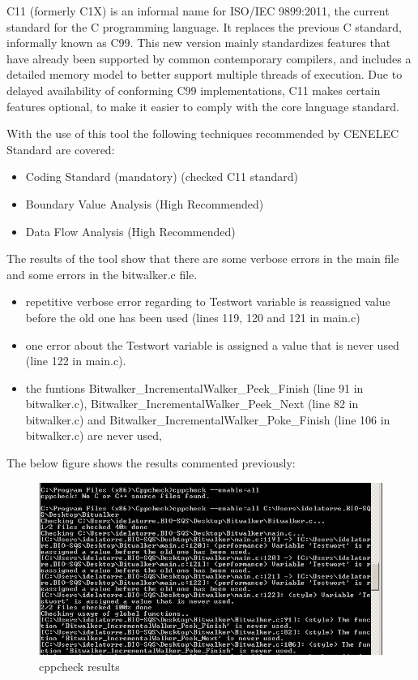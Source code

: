 C11 (formerly C1X) is an informal name for ISO/IEC 9899:2011, the current standard for the C programming language. It replaces the previous C standard, informally known as C99. This new version mainly standardizes features that have already been supported by common contemporary compilers, and includes a detailed memory model to better support multiple threads of execution. Due to delayed availability of conforming C99 implementations, C11 makes certain features optional, to make it easier to comply with the core language standard.

With the use of this tool the following techniques recommended by CENELEC Standard are covered:
\begin{itemize}
\item Coding Standard (mandatory) (checked C11 standard)
\item Boundary Value Analysis (High Recommended)
\item Data Flow Analysis (High Recommended)
\end{itemize}

The results of the tool show that there are some verbose errors in the main file and some errors in the bitwalker.c file.

\begin{itemize}
\item repetitive verbose error regarding to Testwort variable is reassigned value before the old one has been used (lines 119, 120 and 121 in main.c)
\item one error about the Testwort variable is assigned a value that is never used (line 122 in main.c).
\item the funtions Bitwalker\_IncrementalWalker\_Peek\_Finish (line 91 in bitwalker.c), Bitwalker\_IncrementalWalker\_Peek\_Next (line 82 in bitwalker.c) and Bitwalker\_IncrementalWalker\_Poke\_Finish (line 106 in bitwalker.c) are never used,
\end{itemize}  

The below figure shows the results commented previously:
\begin{figure}[H]
\centering
\includegraphics{./figures/cppcheck.png}
\caption{cppcheck results}
\end{figure}

